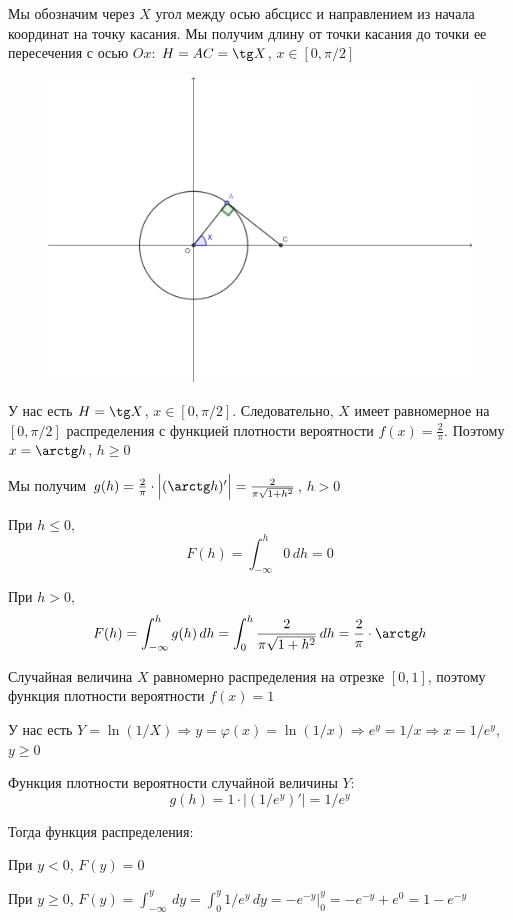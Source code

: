 \begin{exercise}[4] Мы обозначим через $X$ угол между осью абсцисс и направлением из начала координат на точку касания. Мы получим длину от точки касания до точки ее пересечения с осью $Ox$: $H=AC=\tg X$, $x \in [0, \pi/2]$
	\begin{figure}[h]
	\includegraphics{exercise4-8.png}
	\centering
	\end{figure}

У нас есть $H=\tg X$, $x \in [0, \pi/2]$. Следовательно, $X$ имеет равномерное на $[0, \pi/2]$ распределения с функцией плотности вероятности $f(x)=\frac{2}{\pi}$. Поэтому $x = \arctg h$, $h \geq 0$

Мы получим $g(h)=\frac{2}{\pi} \cdot \Big|(\arctg h)'\Big| = \frac{2}{\pi \sqrt{1+h^2}}$, $h > 0$

При $h \leq 0$, $$F(h) = \int_{-\infty}^{h}0\,dh = 0$$

При $h > 0$, $$F(h) = \int_{-\infty}^{h}g(h)\,dh = \int_{0}^{h}\frac{2}{\pi \sqrt{1+h^2}}\,dh = \frac{2}{\pi} \cdot \arctg h$$
\end{exercise}

\begin{exercise}[5]
	Случайная величина $X$ равномерно распределения на отрезке $[0, 1]$, поэтому функция плотности вероятности $f(x)=1$
	
	У нас есть $Y=\ln(1/X) \Rightarrow y=\varphi(x)=\ln(1/x) \Rightarrow e^y = 1/x \Rightarrow x = 1/e^y$, $y \geq 0$
	
	Функция плотности вероятности случайной величины $Y$: $$g(h) = 1 \cdot \Big|(1/e^y)'\Big| = 1/e^y$$
	
	Тогда функция распределения:
	
	При $y<0$, $F(y)=0$
	
	При $y \geq 0$, $F(y) = \int_{-\infty}^{y}\,dy = \int_{0}^{y}1/e^y\,dy = -e^{-y}\Big|^y_0=-e^{-y} + e^0 = 1 - e^{-y}$
\end{exercise}

